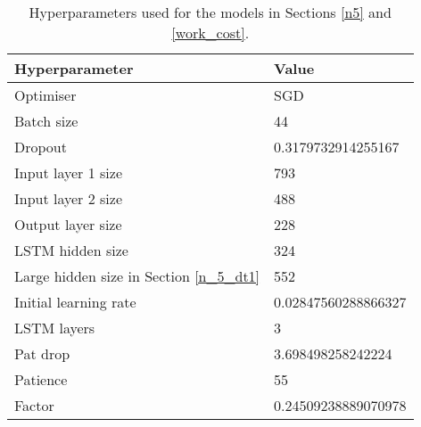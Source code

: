 \begin{table}[h]
	\centering
	\begin{tabular}{l | l}
		Hyperparameter & Value \\
		\hline
		Optimiser & SGD \\
		Batch size & 44 \\
		Dropout & 0.3179732914255167 \\
		Input layer 1 size & 793 \\
		Input layer 2 size & 488 \\
		Output layer size & 228 \\
		LSTM hidden size & 324 \\
		Large hidden size in Section \ref{n_5_dt1} & 552 \\
		Initial learning rate & 0.02847560288866327 \\
		LSTM layers & 3 \\
		Pat drop & 3.698498258242224 \\
		Patience & 55 \\
		Factor & 0.24509238889070978
	\end{tabular}
	\caption{Hyperparameters used for the models in Sections \ref{n5} and \ref{work_cost}.}
	\label{hyperparams_n_5}
\end{table}